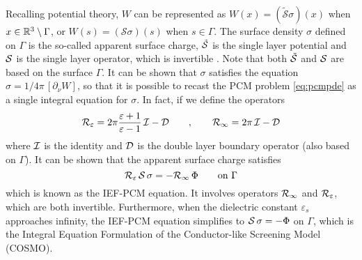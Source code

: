 Recalling potential theory, $W$ can be represented as $W(x) = (\tilde{\mathcal{S}}\sigma)(x)$ when $x \in \mathbb{R}^3 \setminus \Gamma$, or $W(s) = (\mathcal{S}\sigma)(s)$ when $s \in \Gamma$. 
The surface density $\sigma$ defined on $\Gamma$ is the so-called apparent surface charge,  $\tilde{\mathcal{S}}$ is the single layer potential and $\mathcal{S}$ is the single layer operator,  which is invertible \cite{Calderon}. 
Note that both $\tilde{\mathcal{S}}$ and $\mathcal{S}$ are based on the surface $\Gamma$.
It can be shown that $\sigma$ satisfies the equation $\sigma = 1/4\pi \, [ \partial_\nu W]$, so that it is possible to recast the PCM problem \eqref{eq:pcmpde} as a single integral equation for $\sigma$. In fact, if we define the operators 
\begin{equation}
 \label{eq:Reps}
 \mathcal{R}_\varepsilon = 2\pi \frac{\varepsilon+1}{\varepsilon-1} \, \mathcal{I} - \mathcal{D} \qquad, \qquad \mathcal{R}_\infty = 2\pi \, \mathcal{I} - \mathcal{D}
\end{equation}
where $\mathcal{I}$ is the identity and $\mathcal{D}$ is the double layer boundary operator (also based on $\Gamma$).
It can be shown\cite{ReviewPCM_2005} that the apparent surface charge satisfies
\begin{equation}
\label{eq:IEFPCM}
\mathcal{R}_\varepsilon \, \mathcal{S} \, \sigma = - \mathcal{R}_\infty \, \Phi \qquad \text{on }\Gamma
\end{equation}
which is known as the IEF-PCM equation. It involves operators $\mathcal{R}_\infty$ and $\mathcal{R}_\varepsilon$, which are both invertible. Furthermore, when the dielectric constant $\varepsilon_s$ approaches infinity, the IEF-PCM equation simplifies to $\mathcal{S} \, \sigma = - \Phi$ on $\Gamma$, which is the Integral Equation Formulation of the Conductor-like Screening Model (COSMO)\cite{Lipparini_JCP_VPCM}.

